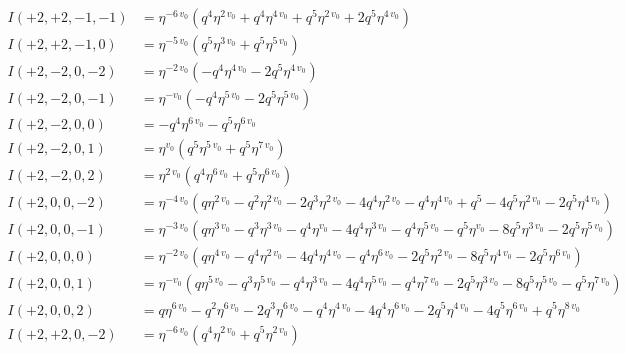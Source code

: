 \documentclass{article}
\begin{document}
\begin{align*}
I(+2, +2, -1, -1) &= \eta^{-6 \, v_{0}} \left( q^{4} \eta^{2 \, v_{0}} + q^{4} \eta^{4 \, v_{0}} + q^{5} \eta^{2 \, v_{0}} + 2 q^{5} \eta^{4 \, v_{0}} \right) \\
I(+2, +2, -1, 0) &= \eta^{-5 \, v_{0}} \left( q^{5} \eta^{3 \, v_{0}} + q^{5} \eta^{5 \, v_{0}} \right) \\
I(+2, -2, 0, -2) &= \eta^{-2 \, v_{0}} \left( -q^{4} \eta^{4 \, v_{0}} - 2 q^{5} \eta^{4 \, v_{0}} \right) \\
I(+2, -2, 0, -1) &= \eta^{-v_{0}} \left( -q^{4} \eta^{5 \, v_{0}} - 2 q^{5} \eta^{5 \, v_{0}} \right) \\
I(+2, -2, 0, 0) &= -q^{4} \eta^{6 \, v_{0}} - q^{5} \eta^{6 \, v_{0}} \\
I(+2, -2, 0, 1) &= \eta^{v_{0}} \left( q^{5} \eta^{5 \, v_{0}} + q^{5} \eta^{7 \, v_{0}} \right) \\
I(+2, -2, 0, 2) &= \eta^{2 \, v_{0}} \left( q^{4} \eta^{6 \, v_{0}} + q^{5} \eta^{6 \, v_{0}} \right) \\
I(+2, 0, 0, -2) &= \eta^{-4 \, v_{0}} \left( q \eta^{2 \, v_{0}} - q^{2} \eta^{2 \, v_{0}} - 2 q^{3} \eta^{2 \, v_{0}} - 4 q^{4} \eta^{2 \, v_{0}} - q^{4} \eta^{4 \, v_{0}} + q^{5} - 4 q^{5} \eta^{2 \, v_{0}} - 2 q^{5} \eta^{4 \, v_{0}} \right) \\
I(+2, 0, 0, -1) &= \eta^{-3 \, v_{0}} \left( q \eta^{3 \, v_{0}} - q^{3} \eta^{3 \, v_{0}} - q^{4} \eta^{v_{0}} - 4 q^{4} \eta^{3 \, v_{0}} - q^{4} \eta^{5 \, v_{0}} - q^{5} \eta^{v_{0}} - 8 q^{5} \eta^{3 \, v_{0}} - 2 q^{5} \eta^{5 \, v_{0}} \right) \\
I(+2, 0, 0, 0) &= \eta^{-2 \, v_{0}} \left( q \eta^{4 \, v_{0}} - q^{4} \eta^{2 \, v_{0}} - 4 q^{4} \eta^{4 \, v_{0}} - q^{4} \eta^{6 \, v_{0}} - 2 q^{5} \eta^{2 \, v_{0}} - 8 q^{5} \eta^{4 \, v_{0}} - 2 q^{5} \eta^{6 \, v_{0}} \right) \\
I(+2, 0, 0, 1) &= \eta^{-v_{0}} \left( q \eta^{5 \, v_{0}} - q^{3} \eta^{5 \, v_{0}} - q^{4} \eta^{3 \, v_{0}} - 4 q^{4} \eta^{5 \, v_{0}} - q^{4} \eta^{7 \, v_{0}} - 2 q^{5} \eta^{3 \, v_{0}} - 8 q^{5} \eta^{5 \, v_{0}} - q^{5} \eta^{7 \, v_{0}} \right) \\
I(+2, 0, 0, 2) &= q \eta^{6 \, v_{0}} - q^{2} \eta^{6 \, v_{0}} - 2 q^{3} \eta^{6 \, v_{0}} - q^{4} \eta^{4 \, v_{0}} - 4 q^{4} \eta^{6 \, v_{0}} - 2 q^{5} \eta^{4 \, v_{0}} - 4 q^{5} \eta^{6 \, v_{0}} + q^{5} \eta^{8 \, v_{0}} \\
I(+2, +2, 0, -2) &= \eta^{-6 \, v_{0}} \left( q^{4} \eta^{2 \, v_{0}} + q^{5} \eta^{2 \, v_{0}} \right) \\

\end{align*}
\end{document}

